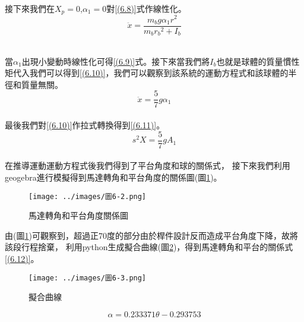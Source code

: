 接下來我們在\(X_p=0\),\(\alpha_1=0\)對\ref{(6.8)}式作線性化。\\

\begin{equation}
\ddot{x}=\frac{m_b g \alpha_1 r^2}{m_b r_b{ }^2+I_b}
\label{(6.9)}
\end{equation}\\

 \newpage


當\(\alpha_1\)出現小變動時線性化可得\ref{(6.9)}式。接下來當我們將\(I_b\)也就是球體的質量慣性矩代入我們可以得到\ref{(6.10)}，我們可以觀察到該系統的運動方程式和該球體的半徑和質量無關。\\

\begin{equation}
\ddot{x}=\frac{5}{7} g \alpha_1
\label{(6.10)}
\end{equation}\\

最後我們對\ref{(6.10)}作拉式轉換得到\ref{(6.11)}。\\

\begin{equation}
s^2 X=\frac{5}{7} g A_1
\label{(6.11)}
\end{equation}\\

在推導運動運動方程式後我們得到了平台角度和球的關係式，
接下來我們利用geogebra進行模擬得到馬達轉角和平台角度的關係圖(圖\ref{(圖 6-2)})。\\

\begin{figure}[h]
\centering
\texttt{[image: ../images/圖6-2.png]}
\caption{馬達轉角和平台角度關係圖}
\label{(圖 6-2)}
\end{figure}



由(圖\ref{(圖 6-2)})可觀察到，超過正70度的部分由於桿件設計反而造成平台角度下降，故將該段行程捨棄，
利用python生成擬合曲線(圖\ref{圖6-3})，得到馬達轉角和平台的關係式\ref{(6.12)}。\\


\begin{figure}[h]
\centering
\texttt{[image: ../images/圖6-3.png]}
\caption{擬合曲線}
\label{圖6-3}
\end{figure}

\begin{equation}
\alpha=0.233371\theta-0.293753
\label{(6.12)}
\end{equation}\\









